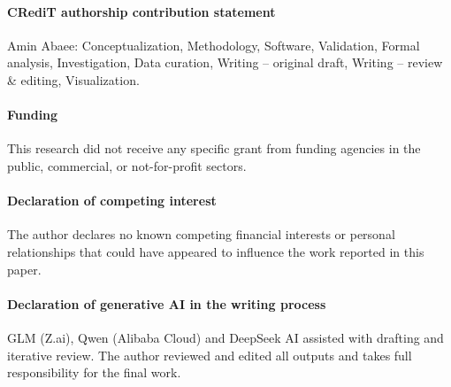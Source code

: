 \paragraph{CRediT authorship contribution statement} Amin Abaee: Conceptualization, Methodology, Software, Validation, Formal analysis, Investigation, Data curation, Writing -- original draft, Writing -- review \& editing, Visualization.

\paragraph{Funding} This research did not receive any specific grant from funding agencies in the public, commercial, or not-for-profit sectors.

\paragraph{Declaration of competing interest} The author declares no known competing financial interests or personal relationships that could have appeared to influence the work reported in this paper.

\paragraph{Declaration of generative AI in the writing process} GLM (Z.ai), Qwen (Alibaba Cloud) and DeepSeek AI assisted with drafting and iterative review. The author reviewed and edited all outputs and takes full responsibility for the final work.


